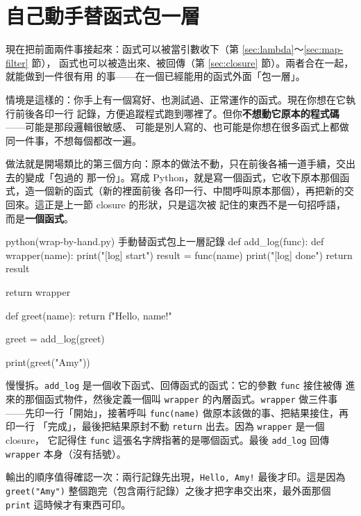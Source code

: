 \section{自己動手替函式包一層}
\label{sec:wrap-by-hand}

現在把前面兩件事接起來：函式可以被當引數收下（第 \ref{sec:lambda}～\ref{sec:map-filter} 節），
函式也可以被造出來、被回傳（第 \ref{sec:closure} 節）。兩者合在一起，就能做到一件很有用
的事——在一個已經能用的函式外面「包一層」。

情境是這樣的：你手上有一個寫好、也測試過、正常運作的函式。現在你想在它執行前後各印一行
記錄，方便追蹤程式跑到哪裡了。但你\textbf{不想動它原本的程式碼}——可能是那段邏輯很敏感、
可能是別人寫的、也可能是你想在很多函式上都做同一件事，不想每個都改一遍。

做法就是開場類比的第三個方向：原本的做法不動，只在前後各補一道手續，交出去的變成「包過的
那一份」。寫成 Python，就是寫一個函式，它收下原本那個函式，造一個新的函式（新的裡面前後
各印一行、中間呼叫原本那個），再把新的交回來。這正是上一節 closure 的形狀，只是這次被
記住的東西不是一句招呼語，而是\textbf{一個函式}。

\begin{example}{python}{(wrap-by-hand.py) 手動替函式包上一層記錄}
def add_log(func):
    def wrapper(name):
        print("[log] start")
        result = func(name)
        print("[log] done")
        return result

    return wrapper


def greet(name):
    return f"Hello, {name}!"


greet = add_log(greet)

print(greet("Amy"))
\end{example}


慢慢拆。\texttt{add\_log} 是一個收下函式、回傳函式的函式：它的參數 \texttt{func} 接住被傳
進來的那個函式物件，然後定義一個叫 \texttt{wrapper} 的內層函式。\texttt{wrapper} 做三件事
——先印一行「開始」，接著呼叫 \texttt{func(name)} 做原本該做的事、把結果接住，再印一行
「完成」，最後把結果原封不動 \texttt{return} 出去。因為 \texttt{wrapper} 是一個 closure，
它記得住 \texttt{func} 這張名字牌指著的是哪個函式。最後 \texttt{add\_log} 回傳
\texttt{wrapper} 本身（沒有括號）。

輸出的順序值得確認一次：兩行記錄先出現，\texttt{Hello, Amy!} 最後才印。這是因為
\texttt{greet("Amy")} 整個跑完（包含兩行記錄）之後才把字串交出來，最外面那個
\texttt{print} 這時候才有東西可印。

